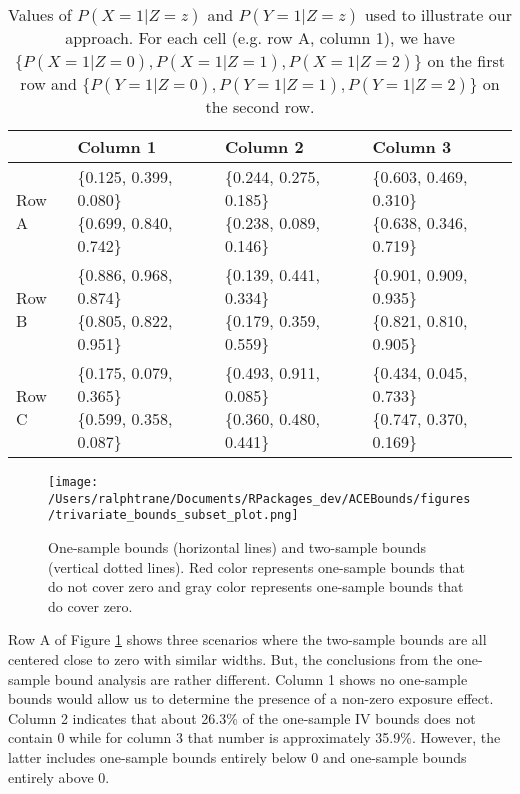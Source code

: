 \documentclass[
]{article}
\theoremstyle{plain}
\begin{document}
\begin{table}[H]
  \center
  \caption{Values of $P(X = 1 | Z = z)$ and $P(Y = 1 | Z = z)$ used to illustrate our approach. For each cell (e.g. row A, column 1), we have $\{P(X = 1 | Z = 0), P(X = 1 | Z = 1), P(X = 1 | Z = 2)\}$ on the first row and $\{P(Y = 1 | Z = 0), P(Y = 1 | Z = 1), P(Y = 1 | Z = 2)\}$ on the second row.}
  \label{tab:subset_plot_summaries}
  
\begin{tabular}{llll}
\toprule
  & Column 1 & Column 2 & Column 3\\
\midrule
Row A & \makecell[l]{\{0.125, 0.399, 0.080\}\\\{0.699, 0.840, 0.742\}} & \makecell[c]{\{0.244, 0.275, 0.185\}\\\{0.238, 0.089, 0.146\}} & \makecell[r]{\{0.603, 0.469, 0.310\}\\\{0.638, 0.346, 0.719\}}\\
Row B & \makecell[l]{\{0.886, 0.968, 0.874\}\\\{0.805, 0.822, 0.951\}} & \makecell[c]{\{0.139, 0.441, 0.334\}\\\{0.179, 0.359, 0.559\}} & \makecell[r]{\{0.901, 0.909, 0.935\}\\\{0.821, 0.810, 0.905\}}\\
Row C & \makecell[l]{\{0.175, 0.079, 0.365\}\\\{0.599, 0.358, 0.087\}} & \makecell[c]{\{0.493, 0.911, 0.085\}\\\{0.360, 0.480, 0.441\}} & \makecell[r]{\{0.434, 0.045, 0.733\}\\\{0.747, 0.370, 0.169\}}\\
\bottomrule
\end{tabular}


\end{table}

\begin{figure}[H]
  \center
  \texttt{[image: /Users/ralphtrane/Documents/RPackages\_dev/ACEBounds/figures/trivariate\_bounds\_subset\_plot.png]}
  \caption{One-sample bounds (horizontal lines) and two-sample bounds (vertical dotted lines). Red color represents one-sample bounds that do not cover zero and gray color represents one-sample bounds that do cover zero.}
  \label{fig:trivariate_bounds}
\end{figure}

Row A of Figure \ref{fig:trivariate_bounds} shows three scenarios where the two-sample bounds are all centered close to zero with similar widths. But, the conclusions from the one-sample bound analysis are rather different. Column 1 shows no one-sample bounds would allow us to determine the presence of a non-zero exposure effect. Column 2 indicates that about 26.3\% of the one-sample IV bounds does not contain \(0\) while for column 3 that number is approximately 35.9\%. However, the latter includes one-sample bounds entirely below 0 and one-sample bounds entirely above 0.
\end{document}
